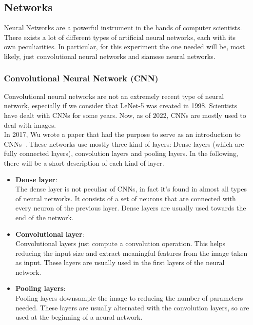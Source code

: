 \documentclass[conference]{IEEEtran}
\begin{document}
		\subsection{Networks}
		
			Neural Networks are a powerful instrument in the hands of computer scientists. There exists a lot of different types of artificial neural networks, each with its own peculiarities. In particular, for this 
			experiment the one needed will be, most likely, just convolutional neural networks and siamese neural networks. 
		
			\subsubsection{Convolutional Neural Network (CNN)}
			
				Convolutional neural networks are not an extremely recent type of neural network, especially if we consider that LeNet-5 was created in 1998. Scientists have dealt with CNNs for some years. Now, as of 2022, 
				CNNs are mostly used to deal with images.\\
				In 2017, Wu wrote a paper that had the purpose to serve as an introduction to CNNs~\cite{wu2017introduction}. These networks use mostly three kind of layers: Dense layers (which are fully connected layers), 
				convolution layers and pooling layers. In the following, there will be a short description of each kind of layer. 
				\begin{itemize}
					
					\item \textbf{Dense layer}:\\
						The dense layer is not peculiar of CNNs, in fact it's found in almost all types of neural networks. It consists of a set of neurons that are connected with every neuron of the previous 
						layer. Dense layers are usually used towards the end of the network.
					
					\item \textbf{Convolutional layer}:\\
						Convolutional layers just compute a convolution operation. This helps reducing the input size and extract meaningful features from the image taken as input. These layers are usually used 
						in the first layers of the neural network.
					
					\item \textbf{Pooling layers}:\\
						Pooling layers downsample the image to reducing the number of parameters needed. These layers are usually alternated with the convolution layers, so are used at the beginning of a neural network.
						
				\end{itemize}
				
\end{document}
